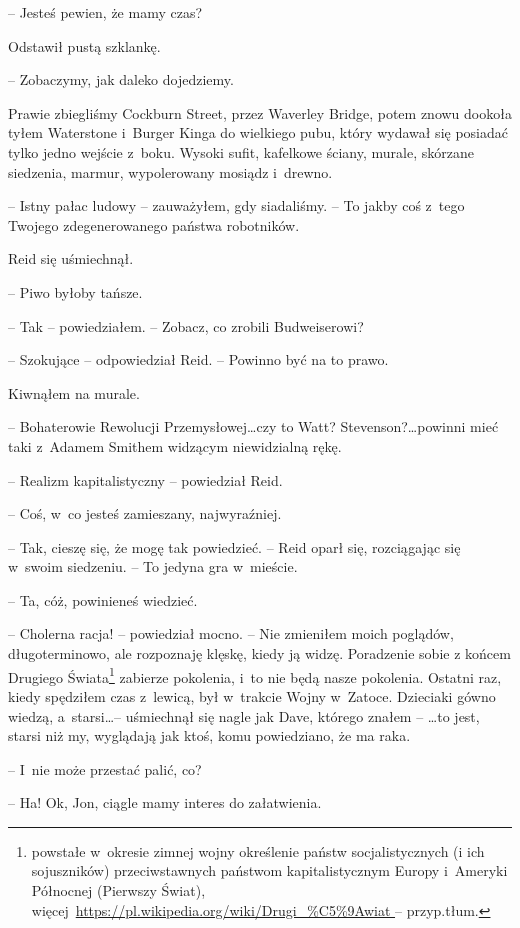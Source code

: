 \documentclass[oneside,polish,11pt,sfheadings]{mwbk}
\begin{document}
-- Jesteś pewien, że mamy czas?

Odstawił pustą szklankę. 

-- Zobaczymy, jak daleko dojedziemy.

Prawie zbiegliśmy Cockburn Street, przez Waverley Bridge, potem znowu
dookoła tyłem Waterstone i~Burger Kinga do wielkiego pubu, który wydawał
się posiadać tylko jedno wejście z~boku. Wysoki sufit, kafelkowe ściany,
murale, skórzane siedzenia, marmur, wypolerowany mosiądz i~drewno.

-- Istny pałac ludowy -- zauważyłem, gdy siadaliśmy. -- To jakby coś z~tego
Twojego zdegenerowanego państwa robotników.

Reid się uśmiechnął. 

-- Piwo byłoby tańsze.

-- Tak -- powiedziałem. -- Zobacz, co zrobili Budweiserowi?

-- Szokujące -- odpowiedział Reid. -- Powinno być na to prawo.

Kiwnąłem na murale. 

-- Bohaterowie Rewolucji Przemysłowej\ldots czy to Watt?
Stevenson?\ldots powinni mieć taki z~Adamem Smithem widzącym niewidzialną
rękę.

-- Realizm kapitalistyczny -- powiedział Reid.

-- Coś, w~co jesteś zamieszany, najwyraźniej.

-- Tak, cieszę się, że mogę tak powiedzieć. -- Reid oparł się, rozciągając
się w~swoim siedzeniu. -- To jedyna gra w~mieście.

-- Ta, cóż, powinieneś wiedzieć.

-- Cholerna racja! -- powiedział mocno. -- Nie zmieniłem moich poglądów,
długoterminowo, ale rozpoznaję klęskę, kiedy ją widzę. Poradzenie sobie
z końcem Drugiego Świata\footnote{ powstałe w~okresie zimnej wojny określenie
państw socjalistycznych (i ich sojuszników) przeciwstawnych państwom
kapitalistycznym Europy i~Ameryki Północnej (Pierwszy Świat),
więcej~\url{https://pl.wikipedia.org/wiki/Drugi_\%C5\%9Awiat
} -- przyp.tłum.} zabierze pokolenia, i~to nie będą nasze pokolenia.
Ostatni raz, kiedy spędziłem czas z~lewicą, był w~trakcie Wojny w~Zatoce. Dzieciaki gówno wiedzą, a~starsi\ldots -- uśmiechnął się nagle jak
Dave, którego znałem -- \ldots to jest, starsi niż my, wyglądają jak ktoś,
komu powiedziano, że ma raka.

-- I~nie może przestać palić, co?

-- Ha! Ok, Jon, ciągle mamy interes do załatwienia.
\end{document}
